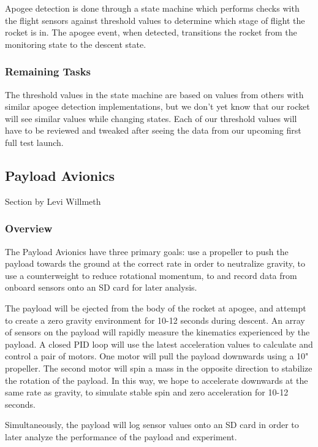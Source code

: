 \documentclass[onecolumn, draftclsnofoot, 10pt, compsoc]{IEEEtran}
\begin{document}
Apogee detection is done through a state machine which performs checks with the flight sensors against threshold values to determine which stage of flight the rocket is in. The apogee event, when detected, transitions the rocket from the monitoring state to the descent state.


\subsubsection{Remaining Tasks}
The threshold values in the state machine are based on values from others with similar apogee detection implementations, but we don't yet know that our rocket will see similar values while changing states.
Each of our threshold values will have to be reviewed and tweaked after seeing the data from our upcoming first full test launch.



\subsection{Payload Avionics}
Section by Levi Willmeth

\subsubsection{Overview}
The Payload Avionics have three primary goals: use a propeller to push the payload towards the ground at the correct rate in order to neutralize gravity, to use a counterweight to reduce rotational momentum, to and record data from onboard sensors onto an SD card for later analysis.

The payload will be ejected from the body of the rocket at apogee, and attempt to create a zero gravity environment for 10-12 seconds during descent.  An array of sensors on the payload will rapidly measure the kinematics experienced by the payload.  A closed PID loop will use the latest acceleration values to calculate and control a pair of motors.  One motor will pull the payload downwards using a 10" propeller.  The second motor will spin a mass in the opposite direction to stabilize the rotation of the payload.  In this way, we hope to accelerate downwards at the same rate as gravity, to simulate stable spin and zero acceleration for 10-12 seconds.

Simultaneously, the payload will log sensor values onto an SD card in order to later analyze the performance of the payload and experiment.
\end{document}
